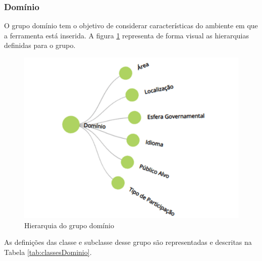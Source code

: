 \newpage
\subsubsection{Domínio}
\label{subsubsec:dominio}
O grupo domínio tem o objetivo de considerar características do ambiente em que a ferramenta está inserida. 
A figura \ref{fig:grupo-dominio} representa de forma visual as hierarquias definidas para o grupo.

\begin{figure}[!ht]
    \centering
    \includegraphics[scale=0.20]{./figuras/dominio.png}
    \caption{Hierarquia do grupo domínio}
    \label{fig:grupo-dominio}
\end{figure}

\par
As definições das classe e subclasse desse grupo são representadas e descritas na Tabela \ref{tab:classesDominio}.

